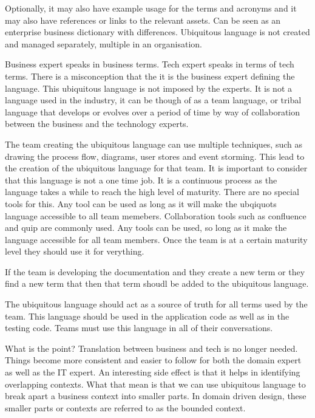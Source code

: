 \documentclass[a4paper, 11pt]{book}
\begin{document}
    Optionally, it may also have example usage for the terms and acronyms and it may also have references or links to the relevant assets.
    Can be seen as an enterprise business dictionary with differences.
    Ubiquitous language is not created and managed separately, multiple in an organisation.

    Business expert speaks in business terms.
    Tech expert speaks in terms of tech terms.
    There is a misconception that the it is the business expert defining the language.
    This ubiquitous language is not imposed by the experts.
    It is not a language used in the industry, it can be though of as a team language, or tribal language that develops or evolves over a period of time by way of collaboration between the business and the technology experts.

    The team creating the ubiquitous language can use multiple techniques, such as drawing the process flow, diagrams, user stores and event storming.
    This lead to the creation of the ubiquitous language for that team.
    It is important to consider that this language is not a one time job.
    It is a continuous process as the language takes a while to reach the high level of maturity.
    There are no special tools for this.
    Any tool can be used as long as it will make the ubqiquots language accessible to all team memebers.
    Collaboration tools such as confluence and quip are commonly used.
    Any tools can be used, so long as it make the language accessible for all team members. Once the team is at a certain maturity level they should use it for verything.

    If the team is developing the documentation and they create a new term or they find a new term that then that term shoudl be added to the ubiquitous language.

    The ubiquitous language should act as a source of truth for all terms used by the team.
    This language should be used in the application code as well as in the testing code.
    Teams must use this language in all of their conversations.

    What is the point?
    Translation between business and tech is no longer needed.
    Things become more consistent and easier to follow for both the domain expert as well as the IT expert.
    An interesting side effect is that it helps in identifying overlapping contexts.
    What that mean is that we can use ubiquitous language to break apart a business context into smaller parts.
    In domain driven design, these smaller parts or contexts are referred to as the bounded context.
\end{document}

